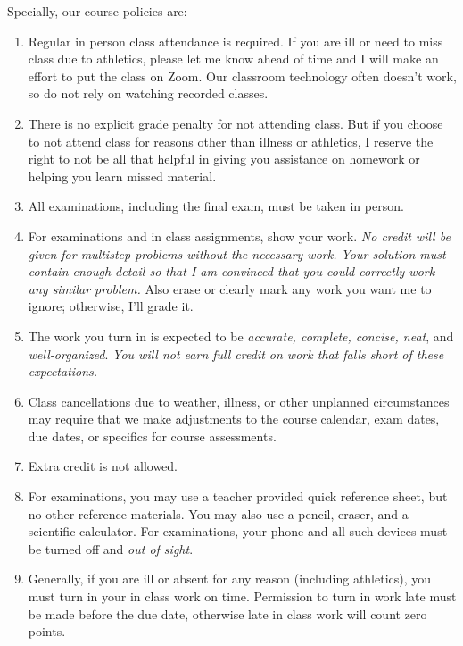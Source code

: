 \documentclass[12pt]{article}
\newcounter{ex}\setcounter{ex}{0}
\begin{document}
\normalsize
Specially, our course policies are:
\begin{enumerate}

\item Regular in person class attendance is required. If you are ill or need to miss 
class due to athletics, please let me know ahead of time and I will make an effort to put the class on Zoom. 
Our classroom technology often doesn't work, so do not rely on watching recorded classes.

\item There is no explicit grade penalty for not attending class. But if you choose to not attend class for reasons other
than illness or athletics, I reserve the right to not be all that helpful in giving you assistance on homework or helping 
you learn missed material.

\item All examinations, including the final exam, must be taken in person.

\item For examinations and in class assignments, show your work.  \emph{No credit will be given for multistep problems without the necessary work. Your solution must contain enough detail
so that I am convinced that you could correctly work any similar problem.} Also erase or clearly mark any work you want me to ignore; otherwise,
I'll grade it.  

\item The work you turn in is expected to be \emph{accurate, 
complete, concise, neat}, and \emph{well-organized}.  
\emph{You will not earn full credit on work that falls short of 
these expectations.}

\item Class cancellations due to weather, illness, or other 
unplanned circumstances may require that we make  adjustments
to the course calendar, exam dates, due dates, or specifics for 
course assessments. 


\item Extra credit is not allowed. 



\item For examinations, you may use a teacher provided quick reference sheet, 
but no other reference materials. You may also use a pencil, eraser, 
and a scientific calculator. For examinations, your phone and all such
devices must be turned off and \emph{out of sight}. 

\item Generally, if you are ill or absent for any reason (including 
athletics), you must turn in your in class work on time. Permission to
turn in work late must be made before the due date, otherwise late in class work 
will count zero points.



\end{enumerate}
\end{document}
